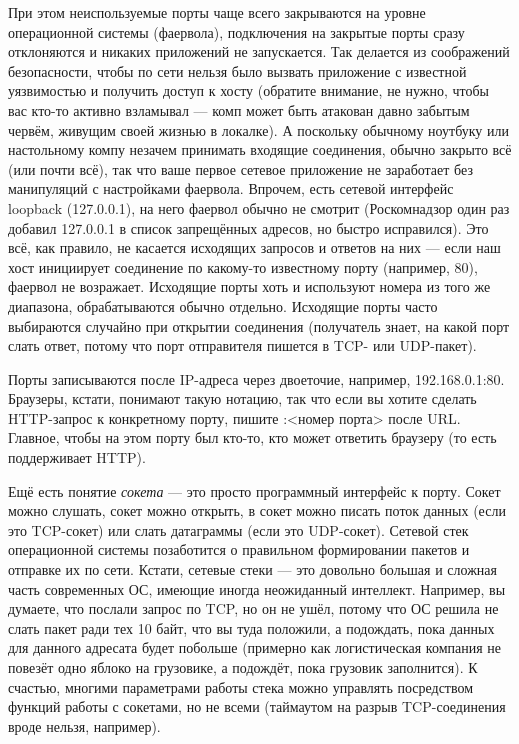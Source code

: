 \documentclass{../../text-style}
\begin{document}
При этом неиспользуемые порты чаще всего закрываются на уровне операционной системы (фаервола), подключения на закрытые порты сразу отклоняются и никаких приложений не запускается. Так делается из соображений безопасности, чтобы по сети нельзя было вызвать приложение с известной уязвимостью и получить доступ к хосту (обратите внимание, не нужно, чтобы вас кто-то активно взламывал --- комп может быть атакован давно забытым червём, живущим своей жизнью в локалке). А поскольку обычному ноутбуку или настольному компу незачем принимать входящие соединения, обычно закрыто всё (или почти всё), так что ваше первое сетевое приложение не заработает без манипуляций с настройками фаервола. Впрочем, есть сетевой интерфейс loopback (127.0.0.1), на него фаервол обычно не смотрит (Роскомнадзор один раз добавил 127.0.0.1 в список запрещённых адресов, но быстро исправился). Это всё, как правило, не касается исходящих запросов и ответов на них --- если наш хост инициирует соединение по какому-то известному порту (например, 80), фаервол не возражает. Исходящие порты хоть и используют номера из того же диапазона, обрабатываются обычно отдельно. Исходящие порты часто выбираются случайно при открытии соединения (получатель знает, на какой порт слать ответ, потому что порт отправителя пишется в TCP- или UDP-пакет). 

Порты записываются после IP-адреса через двоеточие, например, 192.168.0.1:80. Браузеры, кстати, понимают такую нотацию, так что если вы хотите сделать HTTP-запрос к конкретному порту, пишите :<номер порта> после URL. Главное, чтобы на этом порту был кто-то, кто может ответить браузеру (то есть поддерживает HTTP).

Ещё есть понятие \textit{сокета} --- это просто программный интерфейс к порту. Сокет можно слушать, сокет можно открыть, в сокет можно писать поток данных (если это TCP-сокет) или слать датаграммы (если это UDP-сокет). Сетевой стек операционной системы позаботится о правильном формировании пакетов и отправке их по сети. Кстати, сетевые стеки --- это довольно большая и сложная часть современных ОС, имеющие иногда неожиданный интеллект. Например, вы думаете, что послали запрос по TCP, но он не ушёл, потому что ОС решила не слать пакет ради тех 10 байт, что вы туда положили, а подождать, пока данных для данного адресата будет побольше (примерно как логистическая компания не повезёт одно яблоко на грузовике, а подождёт, пока грузовик заполнится). К счастью, многими параметрами работы стека можно управлять посредством функций работы с сокетами, но не всеми (таймаутом на разрыв TCP-соединения вроде нельзя, например).
\end{document}
